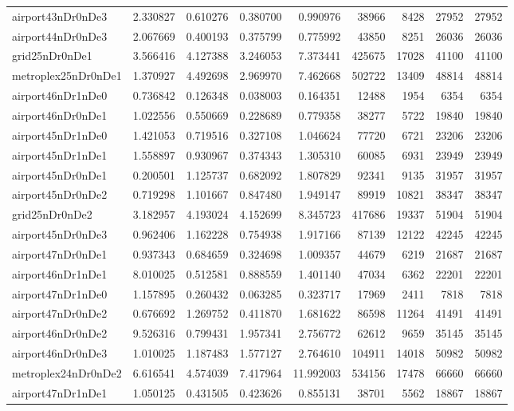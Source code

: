 \begin{longtable}{|l|r|r|r|r|r|r|r|r|}
airport43nDr0nDe3 & 2.330827 & 0.610276 & 0.380700 & 0.990976 & 38966 & 8428 & 27952 & 27952 \\
airport44nDr0nDe3 & 2.067669 & 0.400193 & 0.375799 & 0.775992 & 43850 & 8251 & 26036 & 26036 \\
grid25nDr0nDe1 & 3.566416 & 4.127388 & 3.246053 & 7.373441 & 425675 & 17028 & 41100 & 41100 \\
metroplex25nDr0nDe1 & 1.370927 & 4.492698 & 2.969970 & 7.462668 & 502722 & 13409 & 48814 & 48814 \\
airport46nDr1nDe0 & 0.736842 & 0.126348 & 0.038003 & 0.164351 & 12488 & 1954 & 6354 & 6354 \\
airport46nDr0nDe1 & 1.022556 & 0.550669 & 0.228689 & 0.779358 & 38277 & 5722 & 19840 & 19840 \\
airport45nDr1nDe0 & 1.421053 & 0.719516 & 0.327108 & 1.046624 & 77720 & 6721 & 23206 & 23206 \\
airport45nDr1nDe1 & 1.558897 & 0.930967 & 0.374343 & 1.305310 & 60085 & 6931 & 23949 & 23949 \\
airport45nDr0nDe1 & 0.200501 & 1.125737 & 0.682092 & 1.807829 & 92341 & 9135 & 31957 & 31957 \\
airport45nDr0nDe2 & 0.719298 & 1.101667 & 0.847480 & 1.949147 & 89919 & 10821 & 38347 & 38347 \\
grid25nDr0nDe2 & 3.182957 & 4.193024 & 4.152699 & 8.345723 & 417686 & 19337 & 51904 & 51904 \\
airport45nDr0nDe3 & 0.962406 & 1.162228 & 0.754938 & 1.917166 & 87139 & 12122 & 42245 & 42245 \\
airport47nDr0nDe1 & 0.937343 & 0.684659 & 0.324698 & 1.009357 & 44679 & 6219 & 21687 & 21687 \\
airport46nDr1nDe1 & 8.010025 & 0.512581 & 0.888559 & 1.401140 & 47034 & 6362 & 22201 & 22201 \\
airport47nDr1nDe0 & 1.157895 & 0.260432 & 0.063285 & 0.323717 & 17969 & 2411 & 7818 & 7818 \\
airport47nDr0nDe2 & 0.676692 & 1.269752 & 0.411870 & 1.681622 & 86598 & 11264 & 41491 & 41491 \\
airport46nDr0nDe2 & 9.526316 & 0.799431 & 1.957341 & 2.756772 & 62612 & 9659 & 35145 & 35145 \\
airport46nDr0nDe3 & 1.010025 & 1.187483 & 1.577127 & 2.764610 & 104911 & 14018 & 50982 & 50982 \\
metroplex24nDr0nDe2 & 6.616541 & 4.574039 & 7.417964 & 11.992003 & 534156 & 17478 & 66660 & 66660 \\
airport47nDr1nDe1 & 1.050125 & 0.431505 & 0.423626 & 0.855131 & 38701 & 5562 & 18867 & 18867 \\

\end{longtable}
